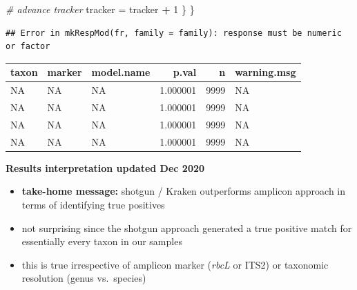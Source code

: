 \documentclass[
]{article}
\newenvironment{Shaded}{\begin{snugshade}}{\end{snugshade}}
\newcommand{\CommentTok}[1]{\textcolor[rgb]{0.56,0.35,0.01}{\textit{#1}}}
\newcommand{\DataTypeTok}[1]{\textcolor[rgb]{0.13,0.29,0.53}{#1}}
\newcommand{\DecValTok}[1]{\textcolor[rgb]{0.00,0.00,0.81}{#1}}
\newcommand{\KeywordTok}[1]{\textcolor[rgb]{0.13,0.29,0.53}{\textbf{#1}}}
\newcommand{\NormalTok}[1]{#1}
\newcommand{\OperatorTok}[1]{\textcolor[rgb]{0.81,0.36,0.00}{\textbf{#1}}}
\newcommand{\StringTok}[1]{\textcolor[rgb]{0.31,0.60,0.02}{#1}}
\providecommand{\tightlist}{%
  \setlength{\itemsep}{0pt}\setlength{\parskip}{0pt}}
\begin{document}
\begin{Shaded}
\begin{Highlighting}[]
        \CommentTok{# advance tracker}
\NormalTok{        tracker =}\StringTok{ }\NormalTok{tracker }\OperatorTok{+}\StringTok{ }\DecValTok{1}
\NormalTok{      \}}
\NormalTok{    \}}
\end{Highlighting}
\end{Shaded}

\begin{verbatim}
## Error in mkRespMod(fr, family = family): response must be numeric or factor
\end{verbatim}

\begin{Shaded}
\end{Shaded}

\begin{table}[H]
\centering
\begin{tabular}{l|l|l|r|r|l}
\hline
taxon & marker & model.name & p.val & n & warning.msg\\
\hline
NA & NA & NA & 1.000001 & 9999 & NA\\
\hline
NA & NA & NA & 1.000001 & 9999 & NA\\
\hline
NA & NA & NA & 1.000001 & 9999 & NA\\
\hline
NA & NA & NA & 1.000001 & 9999 & NA\\
\hline
\end{tabular}
\end{table}

\textbf{Results interpretation updated Dec 2020}

\begin{itemize}
\tightlist
\item
  \textbf{take-home message:} shotgun / Kraken outperforms amplicon
  approach in terms of identifying true positives
\item
  not surprising since the shotgun approach generated a true positive
  match for essentially every taxon in our samples
\item
  this is true irrespective of amplicon marker (\emph{rbcL} or ITS2) or
  taxonomic resolution (genus vs.~species)
\end{itemize}
\end{document}
